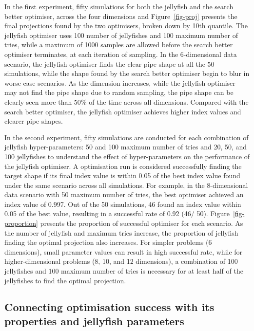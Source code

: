\documentclass[
  number,
  preprint,
  3p]{elsarticle}
\begin{document}
In the first experiment, fifty simulations for both the jellyfish and
the search better optimiser, across the four dimensions and
Figure~\ref{fig-proj} presents the final projections found by the two
optimisers, broken down by 10th quantile. The jellyfish optimiser uses
100 number of jellyfishes and 100 maximum number of tries, while a
maximum of 1000 samples are allowed before the search better optimiser
terminates, at each iteration of sampling. In the 6-dimensional data
scenario, the jellyfish optimiser finds the clear pipe shape at all the
50 simulations, while the shape found by the search better optimiser
begin to blur in worse case scenarios. As the dimension increases, while
the jellyfish optimiser may not find the pipe shape due to random
sampling, the pipe shape can be clearly seen more than 50\% of the time
across all dimensions. Compared with the search better optimiser, the
jellyfish optimiser achieves higher index values and clearer pipe
shapes.

In the second experiment, fifty simulations are conducted for each
combination of jellyfish hyper-parameters: 50 and 100 maximum number of
tries and 20, 50, and 100 jellyfishes to understand the effect of
hyper-parameters on the performance of the jellyfish optimiser. A
optimisation run is considered successfully finding the target shape if
its final index value is within 0.05 of the best index value found under
the same scenario across all simulations. For example, in the
8-dimensional data scenario with 50 maximum number of tries, the best
optimiser achieved an index value of 0.997. Out of the 50 simulations,
46 found an index value within 0.05 of the best value, resulting in a
successful rate of 0.92 (46/ 50). Figure~\ref{fig-proportion} presents
the proportion of successful optimiser for each scenario. As the number
of jellyfish and maximum tries increase, the proportion of jellyfish
finding the optimal projection also increases. For simpler problems (6
dimensions), small parameter values can result in high successful rate,
while for higher-dimensional problems (8, 10, and 12 dimensions), a
combination of 100 jellyfishes and 100 maximum number of tries is
necessary for at least half of the jellyfishes to find the optimal
projection.

\subsection{Connecting optimisation success with its properties and
jellyfish
parameters}\label{connecting-optimisation-success-with-its-properties-and-jellyfish-parameters}
\end{document}
